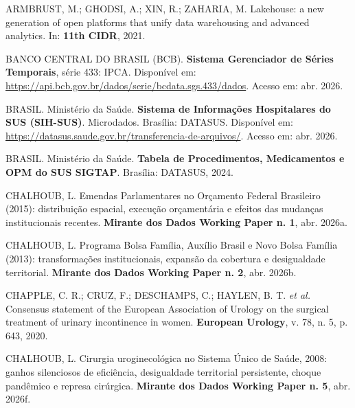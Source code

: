 \documentclass[12pt,a4paper,oneside]{article}
\begin{document}
\begin{singlespace}\small
\noindent\hangindent=1.25cm
ARMBRUST, M.; GHODSI, A.; XIN, R.; ZAHARIA, M. Lakehouse: a new
generation of open platforms that unify data warehousing and
advanced analytics. In: \textbf{11th CIDR}, 2021.\par\smallskip

\noindent\hangindent=1.25cm
BANCO CENTRAL DO BRASIL (BCB). \textbf{Sistema Gerenciador de
Séries Temporais}, série 433: IPCA. Disponível em:
\url{https://api.bcb.gov.br/dados/serie/bcdata.sgs.433/dados}.
Acesso em: abr. 2026.\par\smallskip

\noindent\hangindent=1.25cm
BRASIL. Ministério da Saúde. \textbf{Sistema de Informações
Hospitalares do SUS (SIH-SUS)}. Microdados. Brasília: DATASUS.
Disponível em:
\url{https://datasus.saude.gov.br/transferencia-de-arquivos/}.
Acesso em: abr. 2026.\par\smallskip

\noindent\hangindent=1.25cm
BRASIL. Ministério da Saúde. \textbf{Tabela de Procedimentos,
Medicamentos e OPM do SUS \textemdash{} SIGTAP}. Brasília:
DATASUS, 2024.\par\smallskip

\noindent\hangindent=1.25cm
CHALHOUB, L. Emendas Parlamentares no Orçamento Federal
Brasileiro (2015): distribuição espacial,
execução orçamentária e efeitos das mudanças institucionais
recentes. \textbf{Mirante dos Dados \textemdash{} Working Paper
n. 1}, abr. 2026a.\par\smallskip

\noindent\hangindent=1.25cm
CHALHOUB, L. Programa Bolsa Família, Auxílio Brasil e Novo
Bolsa Família (2013): transformações
institucionais, expansão da cobertura e desigualdade territorial.
\textbf{Mirante dos Dados \textemdash{} Working Paper n. 2},
abr. 2026b.\par\smallskip

\noindent\hangindent=1.25cm
CHAPPLE, C. R.; CRUZ, F.; DESCHAMPS, C.; HAYLEN, B. T.
\textit{et al.} Consensus statement of the European Association
of Urology on the surgical treatment of urinary incontinence in
women. \textbf{European Urology}, v. 78, n. 5,
p. 643, 2020.\par\smallskip

\noindent\hangindent=1.25cm
CHALHOUB, L. Cirurgia uroginecológica no Sistema Único de Saúde,
2008: ganhos silenciosos de eficiência,
desigualdade territorial persistente, choque pandêmico e represa
cirúrgica. \textbf{Mirante dos Dados \textemdash{} Working
Paper n. 5}, abr. 2026f.\par\smallskip


\end{singlespace}
\end{document}

